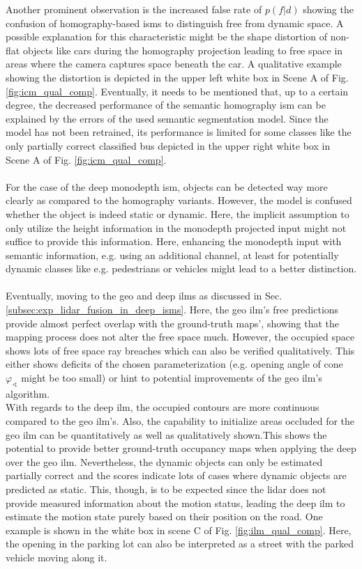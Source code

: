 Another prominent observation is the increased false rate of $p(f|d)$ showing the confusion of homography-based \gls{ism}s to distinguish free from dynamic space. A possible explanation for this characteristic might be the shape distortion of non-flat objects like cars during the homography projection leading to free space in areas where the camera captures space beneath the car. A qualitative example showing the distortion is depicted in the upper left white box in Scene A of Fig. \ref{fig:icm_qual_comp}. Eventually, it needs to be mentioned that, up to a certain degree, the decreased performance of the semantic homography \gls{ism} can be explained by the errors of the used semantic segmentation model. Since the model has not been retrained, its performance is limited for some classes like the only partially correct classified bus depicted in the upper right white box in Scene A of Fig. \ref{fig:icm_qual_comp}.
\\\\
For the case of the deep \gls{monodepth} \gls{ism}, objects can be detected way more clearly as compared to the homography variants. However, the model is confused whether the object is indeed static or dynamic. Here, the implicit assumption to only utilize the height information in the \gls{monodepth} projected input might not suffice to provide this information. Here, enhancing the \gls{monodepth} input with semantic information, e.g. using an additional channel, at least for potentially dynamic classes like e.g. pedestrians or vehicles might lead to a better distinction.
\\\\
Eventually, moving to the geo and deep \gls{ilm}s as discussed in Sec. \ref{subsec:exp_lidar_fusion_in_deep_isms}. Here, the geo \gls{ilm}'s free predictions provide almost perfect overlap with the ground-truth maps', showing that the mapping process does not alter the free space much. However, the occupied space shows lots of free space ray breaches which can also be verified qualitatively. This either shows deficits of the chosen parameterization (e.g. opening angle of cone $\varphi_\sphericalangle$ might be too small) or hint to potential improvements of the geo \gls{ilm}'s algorithm.\\
With regards to the deep \gls{ilm}, the occupied contours are more continuous compared to the geo \gls{ilm}'s. Also, the capability to initialize areas occluded for the geo \gls{ilm} can be quantitatively as well as qualitatively shown.This shows the potential to provide better ground-truth occupancy maps when applying the deep over the geo \gls{ilm}. Nevertheless, the dynamic objects can only be estimated partially correct and the scores indicate lots of cases where dynamic objects are predicted as static. This, though, is to be expected since the lidar does not provide measured information about the motion status, leading the deep \gls{ilm} to estimate the motion state purely based on their position on the road. One example is shown in the white box in scene C of Fig. \ref{fig:ilm_qual_comp}. Here, the opening in the parking lot can also be interpreted as a street with the parked vehicle moving along it.
